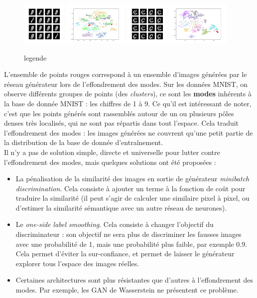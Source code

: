 \begin{figure}[!h]
\centering
\includegraphics[height=60pt]{"images/modes1"}
\includegraphics[height=60pt]{"images/modes1_tsne"}
\includegraphics[height=60pt]{"images/modes2"}
\includegraphics[height=60pt]{"images/modes2_tsne"}
\caption{legende}
\end{figure}

L'ensemble de points rouges correspond à un ensemble d'images générées par le réseau générateur lors de l'effondrement des modes. Sur les données MNIST, on observe différents groupes de points (des \textit{clusters}), ce sont les \textbf{modes} inhérents à la base de donnée MNIST : les chiffres de 1 à 9. Ce qu'il est intéressant de noter, c'est que les points générés sont rassemblés autour de un ou plusieurs pôles denses très localisés, qui ne sont pas répartis dans tout l'espace. Cela traduit l'effondrement des modes : les images générées ne couvrent qu'une petit partie de la distribution de la base de donnée d’entraînement.\\

Il n'y a pas de solution simple, directe et universelle pour lutter contre l'effondrement des modes, mais quelques solutions ont été proposées :
\begin{itemize}
  \item La pénalisation de la similarité des images en sortie de générateur \textit{minibatch discrimination}. Cela consiste à ajouter un terme à la fonction de coût pour traduire la similarité (il peut s'agir de calculer une similaire pixel à pixel, ou d'estimer la similarité sémantique avec un autre réseau de neurones).
  \item Le \textit{one-side label smoothing}. Cela consiste à changer l'objectif du discriminateur : son objectif ne sera plus de discriminer les fausses images avec une probabilité de 1, mais une probabilité plus faible, par exemple 0.9. Cela permet d'éviter la sur-confiance, et permet de laisser le générateur explorer tous l'espace des images réelles.
  \item Certaines architectures sont plus résistantes que d'autres à l'effondrement des modes. Par exemple, les GAN de Wasserstein ne présentent ce problème.
\end{itemize}


